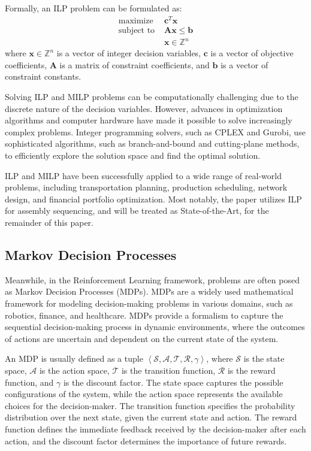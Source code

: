 \documentclass{article}
\begin{document}
Formally, an ILP problem can be formulated as:
\begin{align*}
\text{maximize } & \mathbf{c}^T \mathbf{x} \\
\text{subject to } & \mathbf{Ax} \leq \mathbf{b} \\
& \mathbf{x} \in \mathbb{Z}^n
\end{align*}
where $\mathbf{x} \in \mathbb{Z}^n$ is a vector of integer decision variables, $\mathbf{c}$ is a vector of objective coefficients, $\mathbf{A}$ is a matrix of constraint coefficients, and $\mathbf{b}$ is a vector of constraint constants.

Solving ILP and MILP problems can be computationally challenging due to the discrete nature of the decision variables. However, advances in optimization algorithms and computer hardware have made it possible to solve increasingly complex problems. Integer programming solvers, such as CPLEX and Gurobi, use sophisticated algorithms, such as branch-and-bound and cutting-plane methods, to efficiently explore the solution space and find the optimal solution.

ILP and MILP have been successfully applied to a wide range of real-world problems, including transportation planning, production scheduling, network design, and financial portfolio optimization. Most notably, the paper \citet{Culbertson2019} utilizes ILP for assembly sequencing, and will be treated as State-of-the-Art, for the remainder of this paper.

\subsection{Markov Decision Processes}
Meanwhile, in the Reinforcement Learning framework, problems are often posed as Markov Decision Processes (MDPs). MDPs are a widely used mathematical framework for modeling decision-making problems in various domains, such as robotics, finance, and healthcare. MDPs provide a formalism to capture the sequential decision-making process in dynamic environments, where the outcomes of actions are uncertain and dependent on the current state of the system.

An MDP is usually defined as a tuple $\left\langle\mathcal{S}, \mathcal{A}, \mathcal{T}, \mathcal{R}, \gamma\right\rangle$, where $\mathcal{S}$ is the state space, $\mathcal{A}$ is the action space, $\mathcal{T}$ is the transition function, $\mathcal{R}$ is the reward function, and $\gamma$ is the discount factor. The state space captures the possible configurations of the system, while the action space represents the available choices for the decision-maker. The transition function specifies the probability distribution over the next state, given the current state and action. The reward function defines the immediate feedback received by the decision-maker after each action, and the discount factor determines the importance of future rewards.
\end{document}
